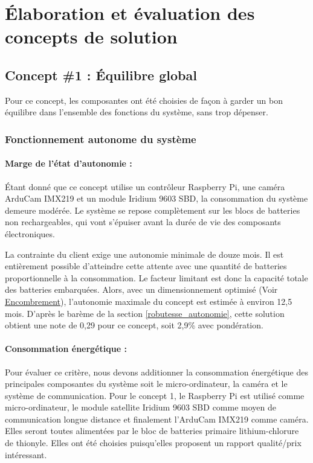 \section{Élaboration et évaluation des concepts de solution}


\subsection{Concept \#1 : Équilibre global}

Pour ce concept, les composantes ont été choisies de façon à garder un bon équilibre dans l'ensemble des fonctions du système, sans trop dépenser.

\subsubsection{Fonctionnement autonome du système}

\paragraph{Marge de l'état d'autonomie :}
Étant donné que ce concept utilise un contrôleur Raspberry Pi, une caméra ArduCam IMX219 et un module Iridium 9603 SBD, la consommation du système demeure modérée.
Le système se repose complètement sur les blocs de batteries non rechargeables, qui vont s’épuiser avant la durée de vie des composants électroniques.

\bigskip
La contrainte du client exige une autonomie minimale de douze mois.
Il est entièrement possible d’atteindre cette attente avec une quantité de batteries proportionnelle à la consommation.
Le facteur limitant est donc la capacité totale des batteries embarquées.
Alors, avec un dimensionnement optimisé (Voir \hyperref[par:encombrement]{Encombrement}), l’autonomie maximale du concept est estimée à environ 12,5 mois.
D’après le barème de la section \ref{robutesse_autonomie}, cette solution obtient une note de 0,29 pour ce concept, soit 2,9\% avec pondération.


\paragraph{Consommation énergétique :}
\label{consommation_concept1}
Pour évaluer ce critère, nous devons additionner la consommation énergétique des principales composantes du système soit le micro-ordinateur,
la caméra et le système de communication. Pour le concept 1, le Raspberry Pi est utilisé comme micro-ordinateur, le module satellite Iridium 9603 SBD comme moyen de communication longue distance et finalement l'ArduCam 
IMX219 comme caméra. Elles seront toutes alimentées par le bloc de batteries primaire lithium-chlorure de thionyle. Elles ont été choisies puisqu'elles proposent un rapport 
qualité/prix intéressant.

